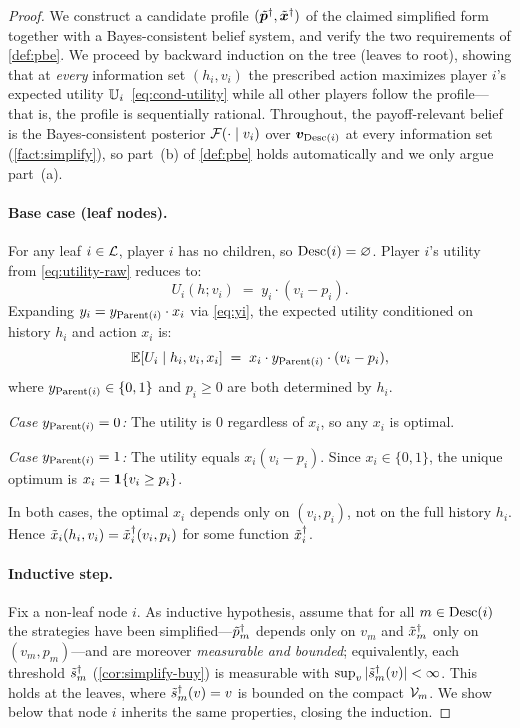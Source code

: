 \begin{proof}
We construct a candidate profile $(\tilde{{\bm{p}}}^\dagger, \tilde{{\bm{x}}}^\dagger)$ of the claimed simplified form together with a Bayes-consistent belief system, and verify the two requirements of \cref{def:pbe}. We proceed by backward induction on the tree (leaves to root), showing that at \emph{every} information set $(h_i, v_i)$ the prescribed action maximizes player $i$'s expected utility $\mathbb{U}_i$~\eqref{eq:cond-utility} while all other players follow the profile---that is, the profile is sequentially rational. Throughout, the payoff-relevant belief is the Bayes-consistent posterior $\mathcal{F}(\cdot \mid v_i)$ over ${\bm{v}}_{\operatorname{Desc}(i)}$ at every information set (\cref{fact:simplify}), so part~(b) of \cref{def:pbe} holds automatically and we only argue part~(a).

\paragraph{Base case (leaf nodes).}
For any leaf $i \in \mathcal{L}$, player $i$ has no children, so $\operatorname{Desc}(i) = \varnothing$. Player $i$'s utility from \cref{eq:utility-raw} reduces to:
\[
U_i(h; v_i) \;=\; y_i \cdot (v_i - p_i).
\]
Expanding $y_i = y_{\operatorname{Parent}(i)} \cdot x_i$ via \cref{eq:yi}, the expected utility conditioned on history $h_i$ and action $x_i$ is:
\[
\mathbb{E}[U_i \mid h_i, v_i, x_i] \;=\; x_i \cdot y_{\operatorname{Parent}(i)} \cdot (v_i - p_i),
\]
where $y_{\operatorname{Parent}(i)} \in \{0,1\}$ and $p_i \ge 0$ are both determined by $h_i$.

\emph{Case $y_{\operatorname{Parent}(i)} = 0$:} The utility is $0$ regardless of $x_i$, so any $x_i$ is optimal.

\emph{Case $y_{\operatorname{Parent}(i)} = 1$:} The utility equals $x_i(v_i - p_i)$. Since $x_i \in \{0,1\}$, the unique optimum is $x_i = \bm{1}\{v_i \ge p_i\}$.

In both cases, the optimal $x_i$ depends only on $(v_i, p_i)$, not on the full history $h_i$. Hence $\tilde{x}_i(h_i, v_i) = \tilde{x}^\dagger_i(v_i, p_i)$ for some function $\tilde{x}^\dagger_i$.

\paragraph{Inductive step.}
Fix a non-leaf node $i$. As inductive hypothesis, assume that for all $m \in \operatorname{Desc}(i)$ the strategies have been simplified---$\tilde{p}^\dagger_m$ depends only on $v_m$ and $\tilde{x}^\dagger_m$ only on $(v_m, p_m)$---and are moreover \emph{measurable and bounded}; equivalently, each threshold $\tilde{s}^\dagger_m$ (\cref{cor:simplify-buy}) is measurable with $\sup_v |\tilde{s}^\dagger_m(v)| < \infty$. This holds at the leaves, where $\tilde{s}^\dagger_m(v) = v$ is bounded on the compact $\mathcal{V}_m$. We show below that node $i$ inherits the same properties, closing the induction.


\end{proof}
